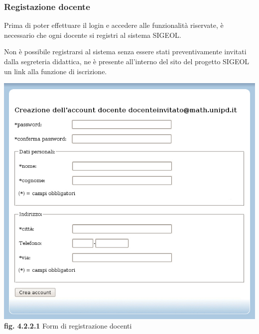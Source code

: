\documentclass[11pt,a4paper]{article}
\begin{document}
\subsubsection{Registazione docente}
Prima di poter effettuare il login e accedere alle funzionalità riservate, è necessario che ogni docente si registri al sistema SIGEOL.

Non è possibile registrarsi al sistema senza essere stati preventivamente invitati dalla segreteria didattica, ne è presente all'interno del sito del progetto SIGEOL un link alla funzione di iscrizione.

\begin{center}
	\includegraphics[scale=0.5]{images/registrazione_docente.jpg}\\ 
	\textbf{fig. 4.2.2.1} Form di registrazione docenti\\
\end{center}
\bigskip
\end{document}
